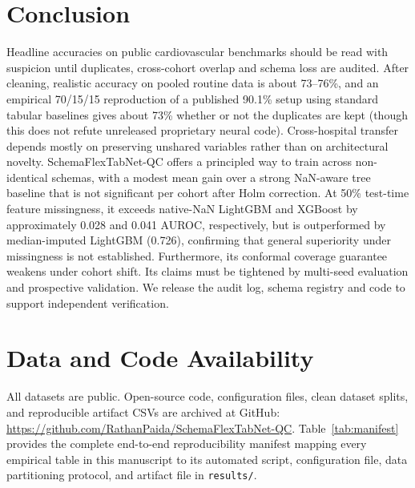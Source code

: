 \documentclass[journal]{IEEEtran}
\newcommand{\sfn}{SchemaFlexTabNet-QC}
\begin{document}
\section{Conclusion}\label{sec:conclusion}
Headline accuracies on public cardiovascular benchmarks should be read with suspicion until duplicates, cross-cohort overlap and schema loss are audited. After cleaning, realistic accuracy on pooled routine data is about 73--76\%, and an empirical 70/15/15 reproduction of a published 90.1\% setup using standard tabular baselines gives about 73\% whether or not the duplicates are kept (though this does not refute unreleased proprietary neural code). Cross-hospital transfer depends mostly on preserving unshared variables rather than on architectural novelty. \sfn{} offers a principled way to train across non-identical schemas, with a modest mean gain over a strong NaN-aware tree baseline that is not significant per cohort after Holm correction. At 50\% test-time feature missingness, it exceeds native-NaN LightGBM and XGBoost by approximately 0.028 and 0.041 AUROC, respectively, but is outperformed by median-imputed LightGBM (0.726), confirming that general superiority under missingness is not established. Furthermore, its conformal coverage guarantee weakens under cohort shift. Its claims must be tightened by multi-seed evaluation and prospective validation. We release the audit log, schema registry and code to support independent verification.

\section*{Data and Code Availability}
All datasets are public. Open-source code, configuration files, clean dataset splits, and reproducible artifact CSVs are archived at GitHub: \url{https://github.com/RathanPaida/SchemaFlexTabNet-QC}. Table~\ref{tab:manifest} provides the complete end-to-end reproducibility manifest mapping every empirical table in this manuscript to its automated script, configuration file, data partitioning protocol, and artifact file in \texttt{results/}.
\end{document}
